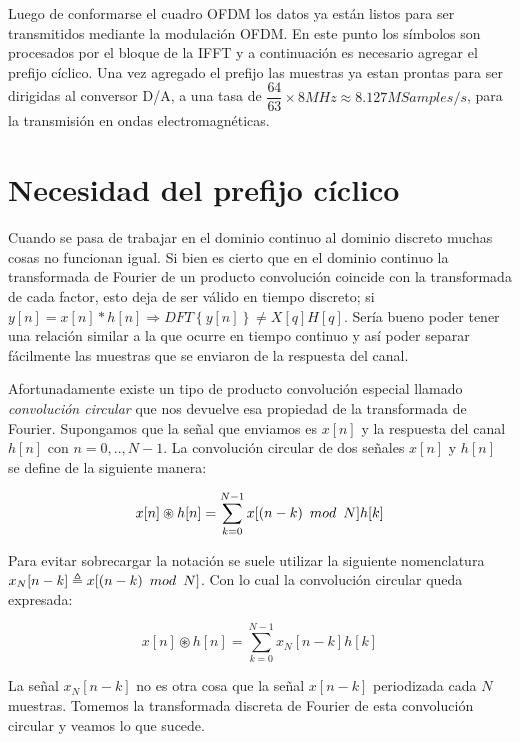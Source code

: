 Luego de conformarse el cuadro OFDM los datos ya están listos para ser transmitidos mediante la modulación OFDM. En este punto los símbolos son procesados por el bloque de la IFFT y a continuación es necesario agregar el prefijo cíclico. Una vez agregado el prefijo las muestras ya estan prontas para ser dirigidas al conversor D/A, a una tasa de $\dfrac{64}{63} \times 8MHz \approx 8.127 MSamples/s$, para la transmisión en ondas electromagnéticas.

\section{Necesidad del prefijo cíclico}

Cuando se pasa de trabajar en el dominio continuo al dominio discreto muchas cosas no funcionan igual. Si bien es cierto que en el dominio continuo la transformada de Fourier de un producto convolución coincide con la transformada de cada factor, esto deja de ser válido en tiempo discreto; si $y[n] = x[n]\ast h[n] \Rightarrow DFT \left\{ y[n] \right\} \neq X[q]H[q]$.
Sería bueno poder tener una relación similar a la que ocurre en tiempo continuo y así poder separar fácilmente las muestras que se enviaron de la respuesta del canal. 

Afortunadamente existe un tipo de producto convolución especial llamado \textit{convolución circular} que nos devuelve esa propiedad de la transformada de Fourier.
Supongamos que la señal que enviamos es $x[n]$ y la respuesta del canal $h[n]$ con $n = 0,..,N-1$. La convolución circular de dos señales $x[n]$ y $h[n]$ se define de la siguiente manera:

\begin{equation}
x[n] \circledast h[n] = \sum_{k = 0}^{N-1} x[(n-k) \enskip mod \enskip N]h[k]
\end{equation} 

Para evitar sobrecargar la notación se suele utilizar la siguiente nomenclatura $x_N[n-k] \triangleq x[(n-k) \enskip mod \enskip N]$. Con lo cual la convolución circular queda expresada:

\begin{equation}
x[n] \circledast h[n] = \sum_{k = 0}^{N-1} x_N[n-k] h[k]
\end{equation} 

La señal $x_N[n-k]$ no es otra cosa que la señal $x[n-k]$ periodizada cada $N$ muestras. Tomemos la transformada discreta de Fourier de esta convolución circular y veamos lo que sucede.

